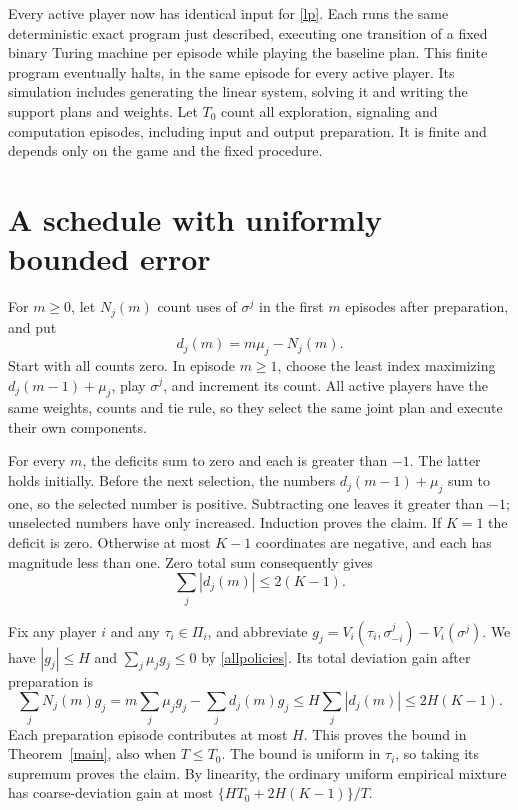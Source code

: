 \documentclass[11pt]{article}
\begin{document}
Every active player now has identical input for \eqref{lp}. Each runs
the same deterministic exact program just described, executing one
transition of a fixed binary Turing machine per episode while playing
the baseline plan. This finite program eventually halts, in the same
episode for every active player. Its simulation includes generating the
linear system, solving it and writing the support plans and weights.
Let $T_0$ count all exploration, signaling and computation episodes,
including input and output preparation. It is finite and depends only
on the game and the fixed procedure.

\section{A schedule with uniformly bounded error}
For $m\geq0$, let $N_j(m)$ count uses of $\sigma^j$ in the first $m$
episodes after preparation, and put
\[
                     d_j(m)=m\mu_j-N_j(m).
\]
Start with all counts zero. In episode $m\geq1$, choose the least index
maximizing $d_j(m-1)+\mu_j$, play $\sigma^j$, and increment its count.
All active players have the same weights, counts and tie rule, so they
select the same joint plan and execute their own components.

For every $m$, the deficits sum to zero and each is greater than $-1$.
The latter holds initially. Before the next selection, the numbers
$d_j(m-1)+\mu_j$ sum to one, so the selected number is positive.
Subtracting one leaves it greater than $-1$; unselected numbers have
only increased. Induction proves the claim. If $K=1$ the deficit is zero.
Otherwise at most $K-1$ coordinates are negative, and each has magnitude
less than one. Zero total sum consequently gives
\begin{equation}\label{discrepancy}
                       \sum_j|d_j(m)|\leq2(K-1).
\end{equation}

\newpage
Fix any player $i$ and any $\tau_i\in\Pi_i$, and abbreviate
$g_j=V_i(\tau_i,\sigma^j_{-i})-V_i(\sigma^j)$.
We have $|g_j|\leq H$ and $\sum_j\mu_jg_j\leq0$ by
\eqref{allpolicies}. Its total deviation gain after preparation is
\[
 \sum_jN_j(m)g_j
   =m\sum_j\mu_jg_j-\sum_jd_j(m)g_j
   \leq H\sum_j|d_j(m)|\leq2H(K-1).
\]
Each preparation episode contributes at most $H$. This proves the bound
in Theorem~\ref{main}, also when $T\leq T_0$. The bound is uniform in
$\tau_i$, so taking its supremum proves the claim. By linearity, the
ordinary uniform empirical mixture has coarse-deviation gain at most
$\{H T_0+2H(K-1)\}/T$.
\end{document}
